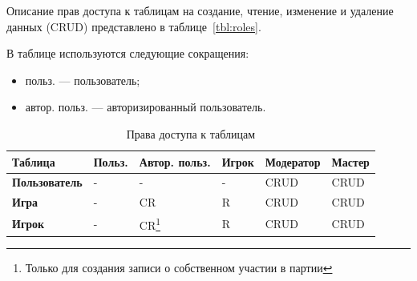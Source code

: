Описание прав доступа к таблицам на создание, чтение, изменение и удаление
данных
(CRUD) представлено в таблице~\ref{tbl:roles}.

В таблице используются следующие сокращения:
\begin{itemize}
	\item польз. --- пользователь;
	\item автор. польз. --- авторизированный пользователь.
\end{itemize}

\begin{longtable}{|p{}|p{}|p{}|p{}|p{}|p{}|}
	\caption{Права доступа к таблицам} \label{tbl:roles}
	\\
	\hline
	\textbf{Таблица}                                                    &
	\textbf{Польз.}                                                     &
	\textbf{Автор. польз.}                                              &
	\textbf{Игрок}                                                      &
	\textbf{Модератор}                                                  &
	\textbf{Мастер}

	\\
	\hline
	\endfirsthead
	\textbf{Пользователь}                                               & -
	                                                                    & -
	                                                                    & -
	                                                                    &
	CRUD
	                                                                    &
	CRUD
	\\ \hline

	\textbf{Игра}                                                       & -
	                                                                    &
	CR                                                                  & R
	                                                                    &
	CRUD
	                                                                    &
	CRUD
	\\ \hline

	\textbf{Игрок}                                                      & -
	                                                                    &
	CR\footnote{\label{join} Только для создания записи о
	собственном участии в партии}                                       & R
	                                                                    &
	CRUD                                                                &
	CRUD
	\\ \hline


\end{longtable}
